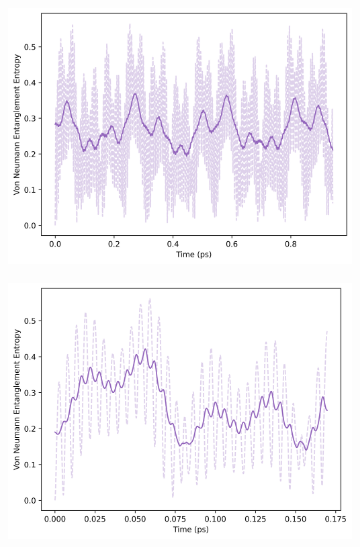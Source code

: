 \documentclass[12pt]{article}
\begin{document}
\begin{figure}[H]
    \centering
    \begin{subfigure}{0.49\textwidth}
        \centering
        \includegraphics[width=\linewidth]{Research Project/Code/results/ExVib/Closed/Envelope/vne_eg.png}
        \caption{}
        \label{fig:EVM_CQS_Ent_env_eg}
    \end{subfigure}
    \hfill
    \begin{subfigure}{0.49\textwidth}
        \centering
        \includegraphics[width=\linewidth]{Research Project/Code/results/ExVib/Closed/Fast/vne_eg.png}
        \caption{}
        \label{fig:EVM_CQS_Ent_fast_eg}
    \end{subfigure}
    
    \caption{}
    \label{fig:EVM_CQS_Ent_eg}
\end{figure}
\end{document}
